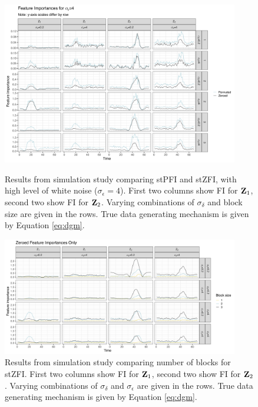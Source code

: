 \documentclass[AMS,STIX2COL]{WileyNJD-v2}
\begin{document}
\begin{figure}[hbtp]
    \centering
    \includegraphics[width=0.92\textwidth]{figures/simulation_zfi_pfi_comparison.png}
    \caption{Results from simulation study comparing stPFI and stZFI, with high level of white noise ($\sigma_{\epsilon}=4$). First two columns show FI for ${\bf Z}_1$, second two show FI for ${\bf Z}_2$. Varying combinations of $\sigma_{\delta}$ and block size are given in the rows. True data generating mechanism is given by Equation \eqref{eq:dgm}.}
    \label{fig:stZFI-stPFI-comparison}
    \vspace{0.5cm}
    \centering
    \includegraphics[width=0.92\textwidth]{figures/simulation_zfi_nblock.png}
    \caption{Results from simulation study comparing number of blocks for stZFI. First two columns show FI for ${\bf Z}_1$, second two show FI for ${\bf Z}_2$. Varying combinations of $\sigma_{\delta}$ and $\sigma_{\epsilon}$ are given in the rows. True data generating mechanism is given by Equation \eqref{eq:dgm}.}
    \label{fig:stZFI-nblock}
\end{figure}
\end{document}
